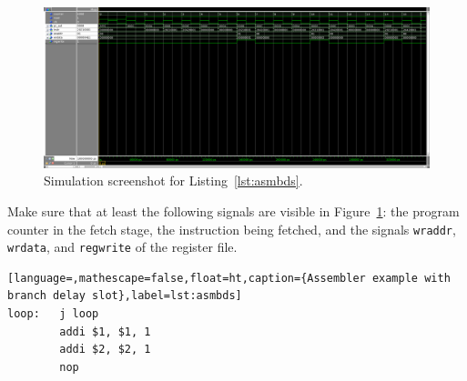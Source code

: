 
\begin{figure}[ht!]
  \centering
  \framebox[\linewidth]{
  }
  \includegraphics[width=1.0\linewidth]{task2.png}
  \caption{Simulation screenshot for Listing~\ref{lst:asmbds}.}
  \label{fig:sim2}
\end{figure}

Make sure that at least the following signals are visible in
Figure~\ref{fig:sim2}: the program counter in the fetch stage, the
instruction being fetched, and the signals \texttt{wraddr},
\texttt{wrdata}, and \texttt{regwrite} of the register file.

\begin{lstlisting}[language=,mathescape=false,float=ht,caption={Assembler example with branch delay slot},label=lst:asmbds]
loop:   j loop
        addi $1, $1, 1
        addi $2, $2, 1
        nop
\end{lstlisting}
